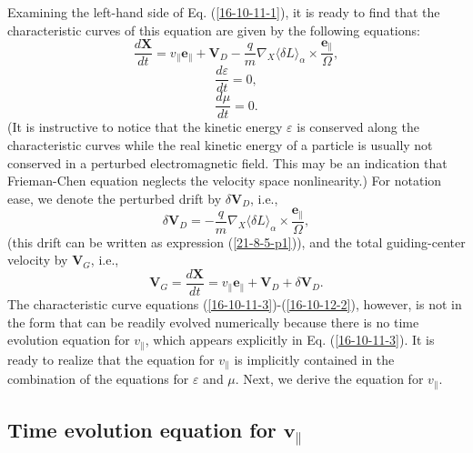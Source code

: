 \documentclass{article}
\begin{document}
Examining the left-hand side of Eq. (\ref{16-10-11-1}), it is ready to find
that the characteristic curves of this equation are given by the following
equations:
\begin{equation}
  \label{16-10-11-3} \frac{d\mathbf{X}}{d t} = v_{\parallel}
  \mathbf{e}_{\parallel} +\mathbf{V}_D - \frac{q}{m} \nabla_X \langle \delta L
  \rangle_{\alpha} \times \frac{\mathbf{e}_{\parallel}}{\Omega},
\end{equation}
\begin{equation}
  \label{16-10-12-1} \frac{d \varepsilon}{d t} = 0,
\end{equation}
\begin{equation}
  \label{16-10-12-2} \frac{d \mu}{d t} = 0.
\end{equation}
(It is instructive to notice that the kinetic energy $\varepsilon$ is
conserved along the characteristic curves while the real kinetic energy of a
particle is usually not conserved in a perturbed electromagnetic field. This
may be an indication that Frieman-Chen equation neglects the velocity space
nonlinearity.) For notation ease, we denote the perturbed drift by $\delta
\mathbf{V}_D$, i.e.,
\begin{equation}
  \label{19-1-3-1} \delta \mathbf{V}_D = - \frac{q}{m} \nabla_X \langle \delta
  L \rangle_{\alpha} \times \frac{\mathbf{e}_{\parallel}}{\Omega},
\end{equation}
(this drift can be written as expression (\ref{21-8-5-p1})), and the total
guiding-center velocity by $\mathbf{V}_G$, i.e.,
\begin{equation}
  \mathbf{V}_G = \frac{d\mathbf{X}}{d t} = v_{\parallel}
  \mathbf{e}_{\parallel} +\mathbf{V}_D + \delta \mathbf{V}_D .
\end{equation}
The characteristic curve equations (\ref{16-10-11-3})-(\ref{16-10-12-2}),
however, is not in the form that can be readily evolved numerically because
there is no time evolution equation for $v_{\parallel}$, which appears
explicitly in Eq. (\ref{16-10-11-3}). It is ready to realize that the equation
for $v_{\parallel}$ is implicitly contained in the combination of the
equations for $\varepsilon$ and $\mu$. Next, we derive the equation for
$v_{\parallel}$.

\subsection{Time evolution equation for $\mathbf{v}_{\parallel}$}
\end{document}
